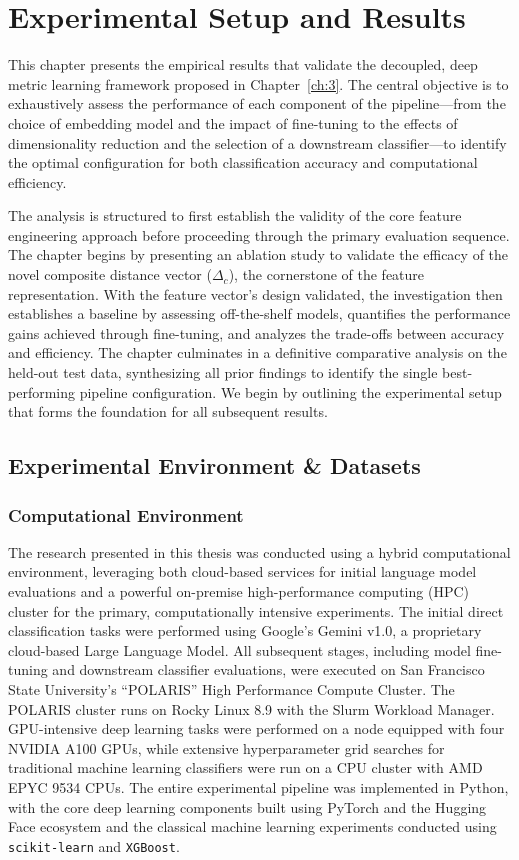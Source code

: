 \chapter{Experimental Setup and Results}\label{ch:4}
This chapter presents the empirical results that validate the decoupled, deep metric learning framework proposed in Chapter~\ref{ch:3}. The central objective is to exhaustively assess the performance of each component of the pipeline---from the choice of embedding model and the impact of fine-tuning to the effects of dimensionality reduction and the selection of a downstream classifier—to identify the optimal configuration for both classification accuracy and computational efficiency.

The analysis is structured to first establish the validity of the core feature engineering approach before proceeding through the primary evaluation sequence. The chapter begins by presenting an ablation study to validate the efficacy of the novel composite distance vector (\(\Delta_c\)), the cornerstone of the feature representation. With the feature vector's design validated, the investigation then establishes a baseline by assessing off-the-shelf models, quantifies the performance gains achieved through fine-tuning, and analyzes the trade-offs between accuracy and efficiency. The chapter culminates in a definitive comparative analysis on the held-out test data, synthesizing all prior findings to identify the single best-performing pipeline configuration. We begin by outlining the experimental setup that forms the foundation for all subsequent results.

\section{Experimental Environment \& Datasets}\label{ch:4.1}

\subsection{Computational Environment}\label{ch:4.1.1}
The research presented in this thesis was conducted using a hybrid computational environment, leveraging both cloud-based services for initial language model evaluations and a powerful on-premise high-performance computing (HPC) cluster for the primary, computationally intensive experiments. The initial direct classification tasks were performed using Google's Gemini v1.0, a proprietary cloud-based Large Language Model. All subsequent stages, including model fine-tuning and downstream classifier evaluations, were executed on San Francisco State University's ``POLARIS'' High Performance Compute Cluster. The POLARIS cluster runs on Rocky Linux 8.9 with the Slurm Workload Manager. GPU-intensive deep learning tasks were performed on a node equipped with four NVIDIA A100 GPUs, while extensive hyperparameter grid searches for traditional machine learning classifiers were run on a CPU cluster with AMD EPYC 9534 CPUs. The entire experimental pipeline was implemented in Python, with the core deep learning components built using PyTorch and the Hugging Face ecosystem and the classical machine learning experiments conducted using \verb|scikit-learn| and \verb|XGBoost|.

